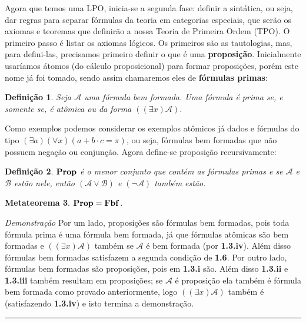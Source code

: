 \documentclass[11pt,a4paper]{article}
\newtheorem{mydef}{Definição}[section]
\newtheorem{mthrm}[mydef]{Metateorema}
\def\eop{\hfill\rule{2.5mm}{2.5mm} \\ }
\theoremstyle{definition}
\begin{document}
Agora que temos uma LPO, inicia-se a segunda fase: definir a sintática, ou seja, dar regras para separar fórmulas da teoria em categorias especiais, que serão os axiomas e teoremas que definirão a nossa Teoria de Primeira Ordem (TPO). O primeiro passo é listar os axiomas lógicos. Os primeiros são as tautologias, mas, para defini-las, precisamos primeiro definir o que é uma \textbf{proposição}. Inicialmente usaríamos átomos (do cálculo proposicional) para formar proposições, porém este nome já foi tomado, sendo assim chamaremos eles de \textbf{fórmulas primas}:

\begin{mydef}
	
	Seja $\mathscr{A}$ uma fórmula bem formada. Uma fórmula é prima se, e somente se, é atômica ou da forma $((\exists x) \mathscr{A})$.
	
\end{mydef}

Como exemplos podemos considerar os exemplos atômicos já dados e fórmulas do tipo $(\exists a)(\forall x)(a+b\cdot c=\pi)$, ou seja, fórmulas bem formadas que não possuem negação ou conjunção. Agora define-se proposição recursivamente: 

\begin{mydef}
	
	$\textrm{\textbf{Prop}}$ é o menor conjunto que contém as fórmulas primas e se $\mathscr{A}$ e $\mathscr{B}$ estão nele, então $(\mathscr{A}\vee \mathscr{B})$ e $(\neg \mathscr{A})$ também estão. 
	
\end{mydef}



\begin{mthrm}
	
	$\textrm{\textbf{Prop}}	= \textrm{\textbf{Fbf}}$.
	
\end{mthrm}

\textit{Demonstração} Por um lado, proposições são fórmulas bem formadas, pois toda fórmula prima é uma fórmula bem formada, já que fórmulas atômicas são bem formadas e $((\exists x) \mathscr{A})$ também se $\mathscr{A}$ é bem formada (por\textbf{ 1.3.iv}). Além disso fórmulas bem formadas satisfazem a segunda condição de \textbf{1.6}. Por outro lado, fórmulas bem formadas são proposições, pois em \textbf{1.3.i} são. Além disso \textbf{1.3.ii} e \textbf{1.3.iii} também resultam em proposições; se $\mathscr{A}$ é proposição ela também é fórmula bem formada como provado anteriormente, logo $((\exists x) \mathscr{A})$ também é (satisfazendo\textbf{ 1.3.iv}) e isto termina a demonstração.\eop 
\end{document}
